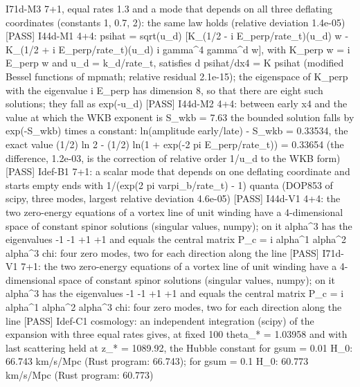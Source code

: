 \documentclass[
  10pt,
]{article}
\newenvironment{Shaded}{}{}
\newcommand{\NormalTok}[1]{#1}
\begin{document}
\begin{Shaded}
\begin{Highlighting}[]
\NormalTok{[PASS] I71d{-}M3  7+1, equal rates 1.3 and a mode that depends on all three deflating coordinates (constants 1, 0.7, 2): the same law holds (relative deviation 1.4e{-}05)}
\NormalTok{[PASS] I44d{-}M1  4+4: psihat = sqrt(u\_d) [K\_(1/2 {-} i E\_perp/rate\_t)(u\_d) w {-} K\_(1/2 + i E\_perp/rate\_t)(u\_d) i gamma\^{}4 gamma\^{}d w], with K\_perp w = i E\_perp w and u\_d = k\_d/rate\_t, satisfies d psihat/dx4 = K psihat (modified Bessel functions of mpmath; relative residual 2.1e{-}15); the eigenspace of K\_perp with the eigenvalue i E\_perp has dimension 8, so that there are eight such solutions; they fall as exp({-}u\_d)}
\NormalTok{[PASS] I44d{-}M2  4+4: between early x4 and the value at which the WKB exponent is S\_wkb = 7.63 the bounded solution falls by exp({-}S\_wkb) times a constant: ln(amplitude early/late) {-} S\_wkb = 0.33534, the exact value (1/2) ln 2 {-} (1/2) ln(1 + exp({-}2 pi E\_perp/rate\_t)) = 0.33654 (the difference, 1.2e{-}03, is the correction of relative order 1/u\_d to the WKB form)}
\NormalTok{[PASS] Idef{-}B1  7+1: a scalar mode that depends on one deflating coordinate and starts empty ends with 1/(exp(2 pi varpi\_b/rate\_t) {-} 1) quanta (DOP853 of scipy, three modes, largest relative deviation 4.6e{-}05)}
\NormalTok{[PASS] I44d{-}V1  4+4: the two zero{-}energy equations of a vortex line of unit winding have a 4{-}dimensional space of constant spinor solutions (singular values, numpy); on it alpha\^{}3 has the eigenvalues {-}1 {-}1 +1 +1 and equals the central matrix P\_c = i alpha\^{}1 alpha\^{}2 alpha\^{}3 chi: four zero modes, two for each direction along the line}
\NormalTok{[PASS] I71d{-}V1  7+1: the two zero{-}energy equations of a vortex line of unit winding have a 4{-}dimensional space of constant spinor solutions (singular values, numpy); on it alpha\^{}3 has the eigenvalues {-}1 {-}1 +1 +1 and equals the central matrix P\_c = i alpha\^{}1 alpha\^{}2 alpha\^{}3 chi: four zero modes, two for each direction along the line}
\NormalTok{[PASS] Idef{-}C1  cosmology: an independent integration (scipy) of the expansion with three equal rates gives, at fixed 100 theta\_* = 1.03958 and with last scattering held at z\_* = 1089.92, the Hubble constant for gsum = 0.01 H\_0: 66.743 km/s/Mpc (Rust program: 66.743); for gsum = 0.1 H\_0: 60.773 km/s/Mpc (Rust program: 60.773)}

\end{Highlighting}
\end{Shaded}
\end{document}
